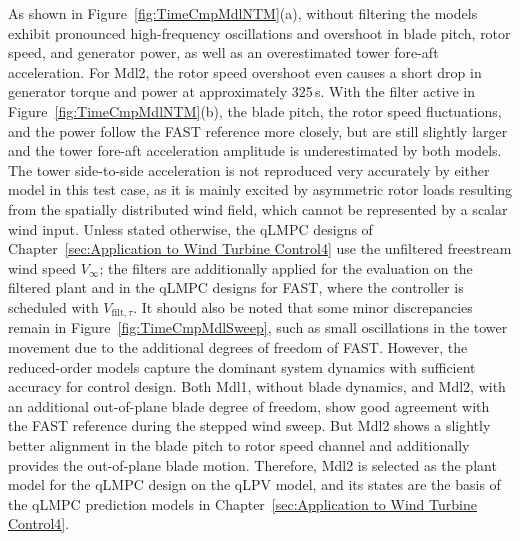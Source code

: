     As shown in Figure~\ref{fig:TimeCmpMdlNTM}(a), without filtering the models exhibit pronounced high-frequency oscillations and overshoot in blade pitch, rotor speed, and generator power, as well as an overestimated tower fore-aft acceleration. For Mdl2, the rotor speed overshoot even causes a short drop in generator torque and power at approximately 325\,s. With the filter active in Figure~\ref{fig:TimeCmpMdlNTM}(b), the blade pitch, the rotor speed fluctuations, and the power follow the FAST reference more closely, but are still slightly larger and the tower fore-aft acceleration amplitude is underestimated by both models. The tower side-to-side acceleration is not reproduced very accurately by either model in this test case, as it is mainly excited by asymmetric rotor loads resulting from the spatially distributed wind field, which cannot be represented by a scalar wind input. Unless stated otherwise, the qLMPC designs of Chapter~\ref{sec:Application to Wind Turbine Control4} use the unfiltered freestream wind speed $V_\infty$; the filters are additionally applied for the evaluation on the filtered plant and in the qLMPC designs for FAST, where the controller is scheduled with $V_{\text{filt},\tau}$.
    It should also be noted that some minor discrepancies remain in Figure~\ref{fig:TimeCmpMdlSweep}, such as small oscillations in the tower movement due to the additional degrees of freedom of FAST. However, the reduced-order models capture the dominant system dynamics with sufficient accuracy for control design. Both Mdl1, without blade dynamics, and Mdl2, with an additional out-of-plane blade degree of freedom, show good agreement with the FAST reference during the stepped wind sweep.  But Mdl2 shows a slightly better alignment in the blade pitch to rotor speed channel and additionally provides the out-of-plane blade motion. Therefore, Mdl2 is selected as the plant model for the qLMPC design on the qLPV model, and its states are the basis of the qLMPC prediction models in Chapter~\ref{sec:Application to Wind Turbine Control4}.
